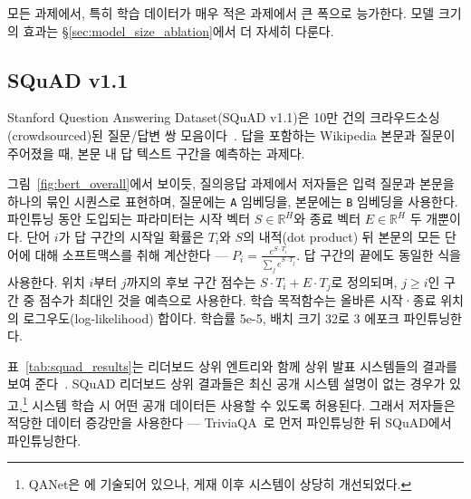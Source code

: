  모든 과제에서, 특히 학습 데이터가 매우 적은 과제에서  큰 폭으로 능가한다. 모델 크기의 효과는 \S\ref{sec:model_size_ablation}에서 더 자세히 다룬다.

\subsection{SQuAD v1.1}
\label{sec:squad}

Stanford Question Answering Dataset(SQuAD v1.1)은 10만 건의 크라우드소싱(crowdsourced)된 질문/답변 쌍 모음이다~\cite{rajpurkar-etal:2016:_squad}. 답을 포함하는 Wikipedia 본문과 질문이 주어졌을 때, 본문 내 답 텍스트 구간을 예측하는 과제다.


그림~\ref{fig:bert_overall}에서 보이듯, 질의응답 과제에서 저자들은
입력 질문과 본문을 하나의 묶인 시퀀스로 표현하며, 질문에는 {\tt A} 임베딩을, 본문에는 {\tt B} 임베딩을 사용한다. 파인튜닝 동안 도입되는 파라미터는 시작 벡터 $S \in \mathbb{R}^H$와 종료 벡터 $E \in \mathbb{R}^H$ 두 개뿐이다.
단어 $i$가 답 구간의 시작일 확률은 $T_i$와 $S$의 내적(dot product) 뒤 본문의 모든 단어에 대해 소프트맥스를 취해 계산한다 — $P_i = \frac{e^{S{\cdot}T_i}}{\sum_j e^{S{\cdot}T_j}}$. 답 구간의 끝에도 동일한 식을 사용한다. 위치 $i$부터 $j$까지의 후보 구간 점수는 $S{\cdot}T_i + E{\cdot}T_j$로 정의되며, $j \geq i$인 구간 중 점수가 최대인 것을 예측으로 사용한다. 학습 목적함수는 올바른 시작·종료 위치의 로그우도(log-likelihood) 합이다. 학습률 5e-5, 배치 크기 32로 3 에포크 파인튜닝한다.




표~\ref{tab:squad_results}는 리더보드 상위 엔트리와 함께 상위 발표 시스템들의 결과를 보여 준다~\cite{bidaf,clark-gardner:2018:_simpl,peters-etal:2018:_deep,hu2017reinforced}.
SQuAD 리더보드 상위 결과들은 최신 공개 시스템 설명이 없는 경우가 있고,\footnote{QANet은 에 기술되어 있으나, 게재 이후 시스템이 상당히 개선되었다.} 시스템 학습 시 어떤 공개 데이터든 사용할 수 있도록 허용된다. 그래서 저자들은 적당한 데이터 증강만을 사용한다 — TriviaQA~\cite{joshi-etal:2017:_triviaq}로 먼저 파인튜닝한 뒤 SQuAD에서 파인튜닝한다.

